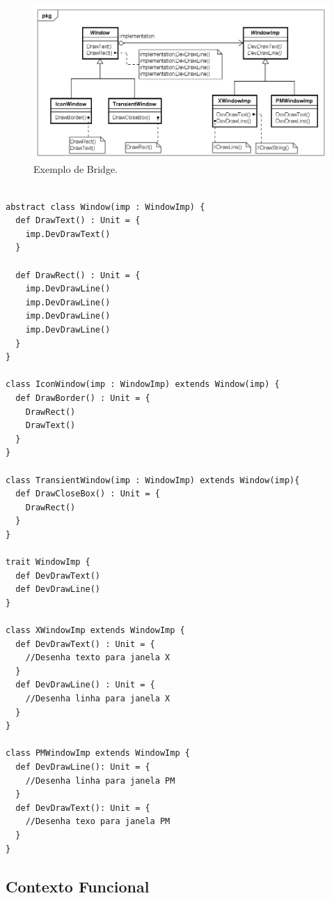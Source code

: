 \begin{figure}[htb]
	\caption{\label{bridge_exemplo}Exemplo de Bridge.}
	\begin{center}
	    \includegraphics[scale=0.5]{5_padroes-contexto-funcional/5.2_estruturais/5.2.2_bridge/bridge_exemplo.png}
	\end{center}
\end{figure}

\begin{lstlisting}[caption={Bridge Orientado a Objetos.},label=oobridge]

abstract class Window(imp : WindowImp) {
  def DrawText() : Unit = {
    imp.DevDrawText()
  }

  def DrawRect() : Unit = {
    imp.DevDrawLine()
    imp.DevDrawLine()
    imp.DevDrawLine()
    imp.DevDrawLine()
  }
}

class IconWindow(imp : WindowImp) extends Window(imp) {
  def DrawBorder() : Unit = {
    DrawRect()
    DrawText()
  }
}

class TransientWindow(imp : WindowImp) extends Window(imp){
  def DrawCloseBox() : Unit = {
    DrawRect()
  }
}

trait WindowImp {
  def DevDrawText()
  def DevDrawLine()
}

class XWindowImp extends WindowImp {
  def DevDrawText() : Unit = {
    //Desenha texto para janela X
  }
  def DevDrawLine() : Unit = {
    //Desenha linha para janela X
  }
}

class PMWindowImp extends WindowImp {
  def DevDrawLine(): Unit = {
    //Desenha linha para janela PM
  }
  def DevDrawText(): Unit = {
    //Desenha texo para janela PM
  }
}

\end{lstlisting}


\subsection*{Contexto Funcional}

